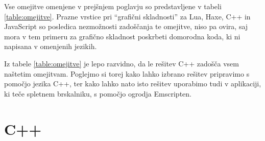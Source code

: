 Vse omejitve omenjene v prejšnjem poglavju so predstavljene v tabeli \ref{table:omejitve}. Prazne vrstice pri ``grafični skladnosti'' za Lua, Haxe, C++ in JavaScript so posledica nezmožnosti zadoščanja te omejitve, niso pa ovira, saj mora v tem primeru za grafično skladnost poskrbeti domorodna koda, ki ni napisana v omenjenih jezikih.

Iz tabele \ref{table:omejitve} je lepo razvidno, da le rešitev C++ zadošča vsem naštetim omejitvam. Poglejmo si torej kako lahko izbrano rešitev pripravimo s pomočjo jezika C++, ter kako lahko nato isto rešitev uporabimo tudi v aplikaciji, ki teče spletnem brskalniku, s pomočjo ogrodja Emscripten.

\begin{table}
\footnotesize
{}
\caption{Pregled funkcionalnosti predstavljenih metod.}
\label{table:omejitve}
\end{table}

\section{C++}

